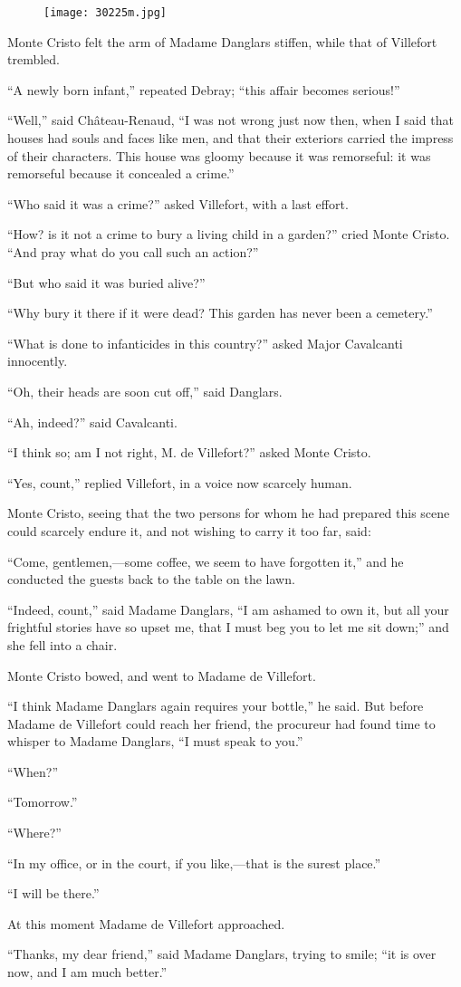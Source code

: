\begin{figure}[ht]
\texttt{[image: 30225m.jpg]}
\end{figure}

Monte Cristo felt the arm of Madame Danglars stiffen, while that of
Villefort trembled.

“A newly born infant,” repeated Debray; “this affair becomes serious!”

“Well,” said Château-Renaud, “I was not wrong just now then, when I
said that houses had souls and faces like men, and that their exteriors
carried the impress of their characters. This house was gloomy because
it was remorseful: it was remorseful because it concealed a crime.”

“Who said it was a crime?” asked Villefort, with a last effort.

“How? is it not a crime to bury a living child in a garden?” cried
Monte Cristo. “And pray what do you call such an action?”

“But who said it was buried alive?”

“Why bury it there if it were dead? This garden has never been a
cemetery.”

“What is done to infanticides in this country?” asked Major Cavalcanti
innocently.

“Oh, their heads are soon cut off,” said Danglars.

“Ah, indeed?” said Cavalcanti.

“I think so; am I not right, M. de Villefort?” asked Monte Cristo.

“Yes, count,” replied Villefort, in a voice now scarcely human.

Monte Cristo, seeing that the two persons for whom he had prepared this
scene could scarcely endure it, and not wishing to carry it too far,
said:

“Come, gentlemen,—some coffee, we seem to have forgotten it,” and he
conducted the guests back to the table on the lawn.

“Indeed, count,” said Madame Danglars, “I am ashamed to own it, but all
your frightful stories have so upset me, that I must beg you to let me
sit down;” and she fell into a chair.

Monte Cristo bowed, and went to Madame de Villefort.

“I think Madame Danglars again requires your bottle,” he said. But
before Madame de Villefort could reach her friend, the procureur had
found time to whisper to Madame Danglars, “I must speak to you.”

“When?”

“Tomorrow.”

“Where?”

“In my office, or in the court, if you like,—that is the surest place.”

“I will be there.”

At this moment Madame de Villefort approached.

“Thanks, my dear friend,” said Madame Danglars, trying to smile; “it is
over now, and I am much better.”
